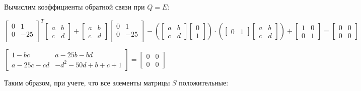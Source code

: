 \documentclass[14pt,a4paper,report]{report}
\begin{document}
Вычислим коэффициенты обратной связи при $Q=E$:

\begin{center}
	$\begin{bmatrix}
	0 & 1 \\
	0 & -25 \\
	\end{bmatrix}^T\begin{bmatrix}
	a & b \\
	c & d 
	\end{bmatrix}+\begin{bmatrix}
	a & b \\
	c & d 
	\end{bmatrix}\begin{bmatrix}
	0 & 1 \\
	0 & -25 \\
	\end{bmatrix}-(\begin{bmatrix}
	a & b \\
	c & d 
	\end{bmatrix}\begin{bmatrix}
	0 \\
	1 
	\end{bmatrix})\cdot(\begin{bmatrix}
	0 & 1
	\end{bmatrix}\begin{bmatrix}
	a & b \\
	c & d 
	\end{bmatrix})+\begin{bmatrix}
	1 & 0 \\
	0 & 1 
	\end{bmatrix}=\begin{bmatrix}
	0 & 0 \\
	0 & 0 
	\end{bmatrix}$
\end{center}

\begin{center}
	$
\begin{bmatrix}
1-bc & a-25b-bd \\
a-25c-cd & -d^2-50d+b+c+1 
\end{bmatrix}=\begin{bmatrix}
0 & 0 \\
0 & 0
\end{bmatrix}
$
\end{center}

Таким образом, при учете, что все элементы матрицы $S$ положительные:
\end{document}
